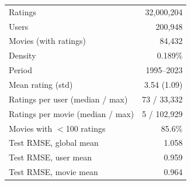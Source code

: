 \begin{tabular}{lr}
\toprule
Ratings & 32{,}000{,}204 \\
Users & 200{,}948 \\
Movies (with ratings) & 84{,}432 \\
Density & 0.189\% \\
Period & 1995--2023 \\
Mean rating (std) & 3.54 (1.09) \\
Ratings per user (median / max) & 73 / 33{,}332 \\
Ratings per movie (median / max) & 5 / 102{,}929 \\
Movies with $<$100 ratings & 85.6\% \\
Test RMSE, global mean & 1.058 \\
Test RMSE, user mean & 0.959 \\
Test RMSE, movie mean & 0.964 \\
\bottomrule
\end{tabular}
